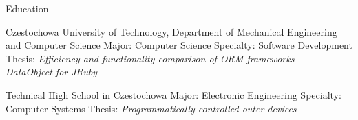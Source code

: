 
\begin{rubric}{Education}


\entry*[2005--2010]
  Czestochowa University of Technology, Department of Mechanical Engineering and Computer Science
\entry* Major: Computer Science
\entry* Specialty: Software Development
\entry* Thesis: \emph{Efficiency and functionality comparison of ORM frameworks -- DataObject for JRuby}

\entry*[1999--2004]
  Technical High School in Czestochowa
\entry* Major: Electronic Engineering
\entry* Specialty: Computer Systems
\entry* Thesis: \emph{Programmatically controlled outer devices}

% 

\end{rubric}

